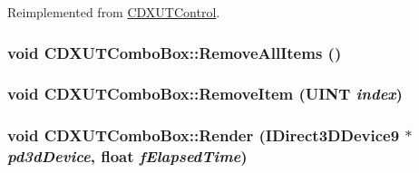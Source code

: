 Reimplemented from \hyperlink{class_c_d_x_u_t_control_a8f1418d201b97e0a9dc83a0e25207eca}{CDXUTControl}.\hypertarget{class_c_d_x_u_t_combo_box_a8554b7a381480a1698e283908bb3ebcc}{
\subsubsection[{RemoveAllItems}]{\setlength{\rightskip}{0pt plus 5cm}void CDXUTComboBox::RemoveAllItems ()}}
\label{class_c_d_x_u_t_combo_box_a8554b7a381480a1698e283908bb3ebcc}
\hypertarget{class_c_d_x_u_t_combo_box_aa2b97d66478fa689d7e05d0e84f227b6}{
\subsubsection[{RemoveItem}]{\setlength{\rightskip}{0pt plus 5cm}void CDXUTComboBox::RemoveItem (UINT {\em index})}}
\label{class_c_d_x_u_t_combo_box_aa2b97d66478fa689d7e05d0e84f227b6}
\hypertarget{class_c_d_x_u_t_combo_box_affcd25fdf9baf53e39e7b50e58ee05d4}{
\subsubsection[{Render}]{\setlength{\rightskip}{0pt plus 5cm}void CDXUTComboBox::Render (IDirect3DDevice9 $\ast$ {\em pd3dDevice}, \/  float {\em fElapsedTime})}}
\label{class_c_d_x_u_t_combo_box_affcd25fdf9baf53e39e7b50e58ee05d4}


